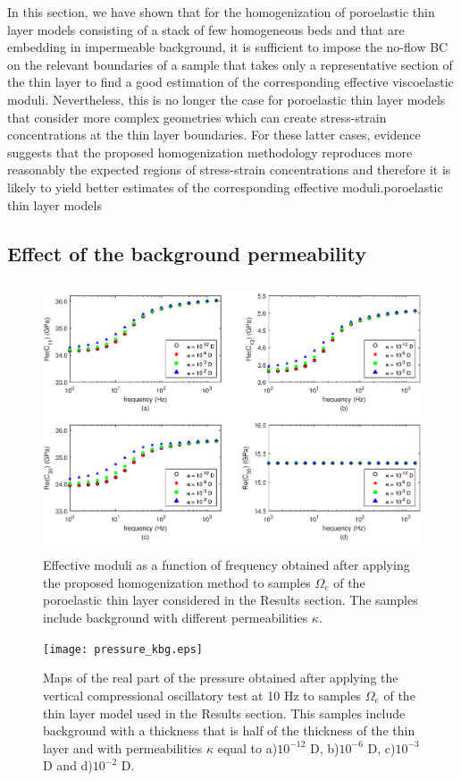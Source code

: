 \documentclass[draft]{agujournal2019}
\begin{document}
In this section, we have shown that for the homogenization of poroelastic thin layer models consisting of a stack of few homogeneous beds and that are embedding in impermeable background, it is sufficient to impose the no-flow BC on the relevant boundaries of a sample that takes only a representative section of the thin layer to find a good estimation of the corresponding effective viscoelastic moduli. Nevertheless, this is no longer the case for poroelastic thin layer models that consider more complex geometries which can create stress-strain concentrations at the thin layer boundaries. For these latter cases, evidence suggests that the proposed homogenization methodology reproduces more reasonably the expected regions of  stress-strain concentrations and therefore it is likely to yield better estimates of the corresponding effective moduli.poroelastic thin layer models

\subsection{Effect of the background permeability}

\begin{figure}[!ht]
\centering
        \includegraphics[width= 120mm, height=80mm]{cijkbg_2sandshale.eps}
\caption{ Effective moduli as a function of frequency obtained after applying the proposed homogenization method to samples $\Omega_e$ of the poroelastic thin layer considered in the Results section. The samples include background with different permeabilities $\kappa$.}
\label{fig.11}
\end{figure}

\begin{figure}[!ht]
\centering
        \texttt{[image: pressure\_kbg.eps]}
\caption{Maps of the real part of the pressure obtained after applying the vertical compressional oscillatory test at 10 Hz to samples $\Omega_e$ of the thin layer model used in the Results section. This samples include background with a thickness that is half of the thickness of the thin layer and with permeabilities $\kappa$ equal to a)$10^{-12}$ D, b)$10^{-6}$ D, c)$10^{-3}$ D and d)$10^{-2}$ D. }
\label{fig.12}
\end{figure}
\end{document}
